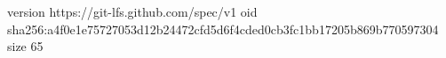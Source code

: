 version https://git-lfs.github.com/spec/v1
oid sha256:a4f0e1e75727053d12b24472cfd5d6f4cded0cb3fc1bb17205b869b770597304
size 65

